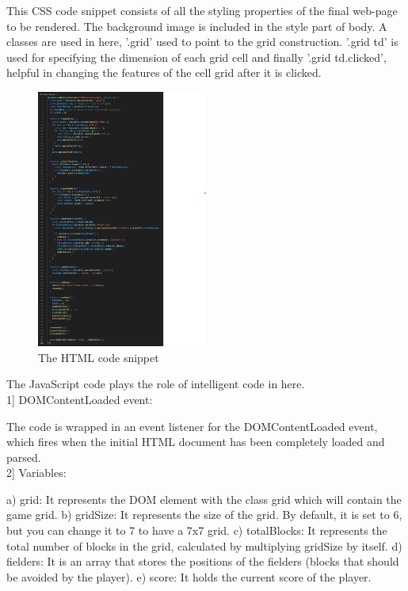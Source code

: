 \documentclass{article}
\begin{document}
This CSS code snippet consists of all the styling properties of the final web-page to be rendered. The background image is included in the style part of body. A classes are used in here, '.grid' used to point to the grid construction. '.grid td' is used for specifying the dimension of each grid cell and finally '.grid td.clicked', helpful in changing the features of the cell grid after it is clicked.\\
    
\begin{figure}[!ht]
    \centering
    \includegraphics[width=0.5\textwidth]{js.png}
    \caption{The HTML code snippet}
    \label{fig:image}
\end{figure}

The JavaScript code plays the role of intelligent code in here.\\

1] DOMContentLoaded event:

The code is wrapped in an event listener for the DOMContentLoaded event, which fires when the initial HTML document has been completely loaded and parsed.\\

2] Variables:

a) grid: It represents the DOM element with the class grid which will contain the game grid.
b) gridSize: It represents the size of the grid. By default, it is set to 6, but you can change it to 7 to have a 7x7 grid.
c) totalBlocks: It represents the total number of blocks in the grid, calculated by multiplying gridSize by itself.
d) fielders: It is an array that stores the positions of the fielders (blocks that should be avoided by the player).
e) score: It holds the current score of the player.\\
\end{document}
